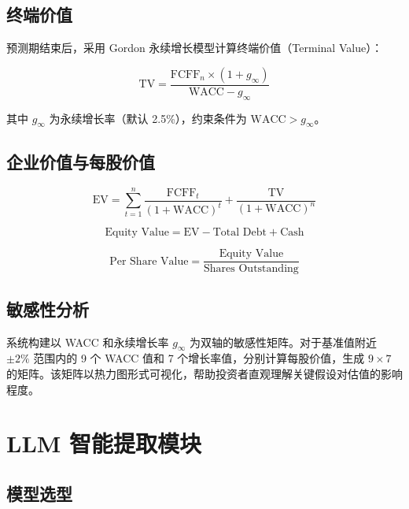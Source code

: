 \documentclass[12pt,a4paper]{article}
\begin{document}
\subsection{终端价值}

预测期结束后，采用 Gordon 永续增长模型计算终端价值（Terminal Value）：

\begin{equation}
\text{TV} = \frac{\text{FCFF}_n \times (1 + g_\infty)}{\text{WACC} - g_\infty}
\label{eq:tv}
\end{equation}

其中 $g_\infty$ 为永续增长率（默认 2.5\%），约束条件为 $\text{WACC} > g_\infty$。

\subsection{企业价值与每股价值}

\begin{equation}
\text{EV} = \sum_{t=1}^{n} \frac{\text{FCFF}_t}{(1 + \text{WACC})^t} + \frac{\text{TV}}{(1 + \text{WACC})^n}
\label{eq:ev}
\end{equation}

\begin{equation}
\text{Equity Value} = \text{EV} - \text{Total Debt} + \text{Cash}
\end{equation}

\begin{equation}
\text{Per Share Value} = \frac{\text{Equity Value}}{\text{Shares Outstanding}}
\end{equation}

\subsection{敏感性分析}

系统构建以 WACC 和永续增长率 $g_\infty$ 为双轴的敏感性矩阵。对于基准值附近 $\pm 2\%$ 范围内的 9 个 WACC 值和 7 个增长率值，分别计算每股价值，生成 $9 \times 7$ 的矩阵。该矩阵以热力图形式可视化，帮助投资者直观理解关键假设对估值的影响程度。

\section{LLM 智能提取模块}

\subsection{模型选型}
\end{document}
